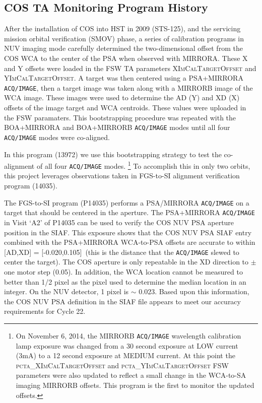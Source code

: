 \subsection{COS TA Monitoring Program History}\label{subsec:History}
After the installation of COS into HST in 2009 (STS-125), and the
servicing mission orbital verification (SMOV) phase,
a series of calibration programs in NUV imaging mode carefully determined the two-dimensional offset from the COS WCA to the center of the PSA when observed with MIRRORA.
These X and Y offsets were loaded in the FSW TA parameters \textsc{XImCalTargetOffset} and \textsc{YImCalTargetOffset}.
A target was then centered using a PSA+MIRRORA \texttt{ACQ/IMAGE}, then a target image was taken along with a MIRRORB image
of the WCA image. These images were used to determine the AD (Y) and XD (X) offsets of the image target and WCA centroids.
These values were uploaded in the FSW paramaters. This bootstrapping procedure was repeated with the BOA+MIRRORA
and BOA+MIRRORB \texttt{ACQ/IMAGE} modes until all four \texttt{ACQ/IMAGE} modes were co-aligned.


In this program (13972) we use this bootstrapping strategy to test the co-alignment of all four \texttt{ACQ/IMAGE} modes.
\footnote{On November 6, 2014, the MIRRORB \texttt{ACQ/IMAGE} wavelength calibration lamp exposure was changed from a 30 second exposure
at LOW current (3mA) to a 12 second exposure at MEDIUM current. At this point the \textsc{pcta\_XImCalTargetOffset} and \textsc{pcta\_YImCalTargetOffset}
FSW parameters were also updated to reflect a small change in the WCA-to-SA imaging MIRRORB offsets. This program is the first to monitor the updated offsets.}
To accomplish this in only two orbits, this project leverages observations taken in FGS-to-SI alignment verification program (14035).

The FGS-to-SI program (P14035) performs a PSA/MIRRORA \texttt{ACQ/IMAGE} on a target that should be centered in the aperture.
The PSA+MIRRORA \texttt{ACQ/IMAGE} in Visit `A2' of P14035 can be used to verify the COS NUV PSA aperture position in the SIAF.
This exposure shows that the COS NUV PSA SIAF entry combined with the PSA+MIRRORA WCA-to-PSA offsets are
accurate to within [AD,XD] = [-0.020,0.105]\arcsec\ (this is the distance that the \texttt{ACQ/IMAGE} slewed to center the target).
The COS aperture is only repeatable in the XD direction to $\pm$ one motor step (0.05\arcsec). In addition, the WCA location
cannot be measured to better than 1/2 pixel as the pixel used to determine the median location in an integer.
On the NUV detector, 1 pixel is $\sim$ 0.023\arcsec. Based upon this information, the COS NUV PSA definition
in the SIAF file appears to meet our accuracy requirements for Cycle 22.

